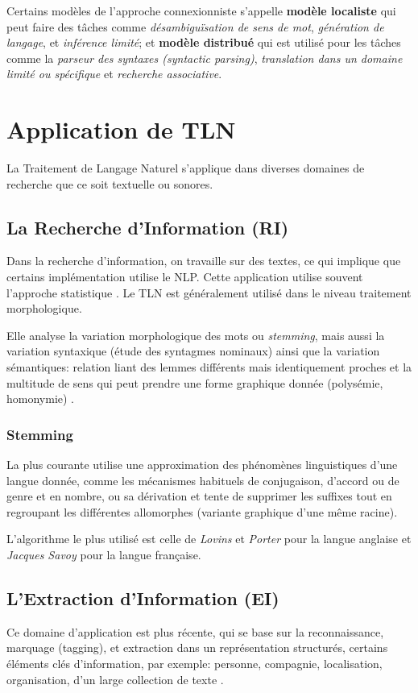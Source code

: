 Certains modèles de l'approche connexionniste s'appelle \textbf{modèle localiste} qui peut faire des tâches comme \emph{désambiguïsation de sens de mot}, \emph{génération de langage}, et \emph{inférence limité}; et \textbf{modèle distribué} qui est utilisé pour les tâches comme la \emph{parseur des syntaxes (syntactic parsing)}, \emph{translation dans un domaine limité ou spécifique} et \emph{recherche associative}.

\section{Application de TLN}
La Traitement de Langage Naturel s'applique dans diverses domaines de recherche que ce soit textuelle ou sonores.

\subsection*{La Recherche d'Information (RI)}
Dans la recherche d'information, on travaille sur des textes, ce qui implique que certains implémentation utilise le NLP. Cette application utilise souvent l'approche statistique \citep{natural-language-processing}. Le TLN est généralement utilisé dans le niveau traitement morphologique.

Elle analyse la variation morphologique des mots ou \emph{stemming}, mais aussi la variation syntaxique (étude des syntagmes nominaux) ainsi que la variation sémantiques: relation liant des lemmes différents mais identiquement proches et la multitude de sens qui peut prendre une forme graphique donnée (polysémie, homonymie) \citep{automatic-nlp}.

\subsubsection*{Stemming}
\citep{automatic-nlp} La plus courante utilise une approximation des phénomènes linguistiques d'une langue donnée, comme les mécanismes habituels de conjugaison, d'accord ou de genre et en nombre, ou sa dérivation et tente de supprimer les suffixes tout en regroupant les différentes allomorphes (variante graphique d'une même racine).

L'algorithme le plus utilisé est celle de \emph{Lovins} et \emph{Porter} pour la langue anglaise et \emph{Jacques Savoy} pour la langue française.

\subsection*{L'Extraction d'Information (EI)}
Ce domaine d'application est plus récente, qui se base sur la reconnaissance, marquage (tagging), et extraction dans un représentation structurés, certains éléments clés d'information, par exemple: personne, compagnie, localisation, organisation, d'un large collection de texte \citep{automatic-nlp}.

